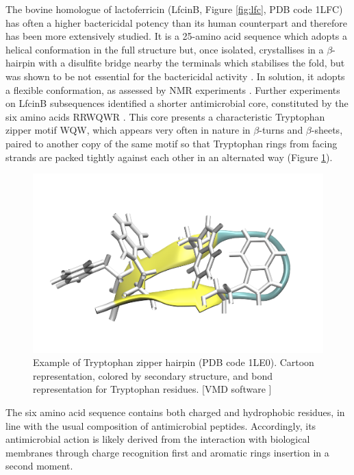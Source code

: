 The bovine homologue of lactoferricin (LfcinB, Figure \ref{fig:lfc}, PDB code 1LFC) has often a higher bactericidal potency than its human counterpart \citep{Cochran2001} and therefore has been more extensively studied. It is a 25-amino acid sequence which adopts a helical conformation in the full structure but, once isolated, crystallises in a $\beta$-hairpin with a disulfite bridge nearby the terminals which stabilises the fold, but was shown to be not essential for the bactericidal activity \citep{Cochran2001}.
%
In solution, it adopts a flexible conformation, as assessed by NMR experiments \citep{Hwang1998}. 
%
Further experiments on LfcinB subsequences identified a shorter antimicrobial core, constituted by the six amino acids RRWQWR \citep{Schibli1999}. This core presents a characteristic Tryptophan zipper motif WQW, which appears very often in nature in $\beta$-turns and $\beta$-sheets, paired to another copy of the same motif \citep{Cochran2001} so that Tryptophan rings from facing strands are packed tightly against each other in an alternated way (Figure \ref{fig:trp_zip}).

\begin{figure}
\begin{center}
\includegraphics[width=0.5\linewidth]{1introduction/pics/trp_zip}
\caption[TRyptophan zipper 1LE0]{Example of Tryptophan zipper hairpin (PDB code 1LE0). Cartoon representation, colored by secondary structure, and bond representation for Tryptophan residues. [VMD software \citet{HUMP96}]} \label{fig:trp_zip}
\end{center}
\end{figure}

The six amino acid sequence contains both charged and hydrophobic residues, in line with the usual composition of antimicrobial peptides. Accordingly, its antimicrobial action is likely derived from the interaction with biological membranes through charge recognition first and aromatic rings insertion in a second moment.

